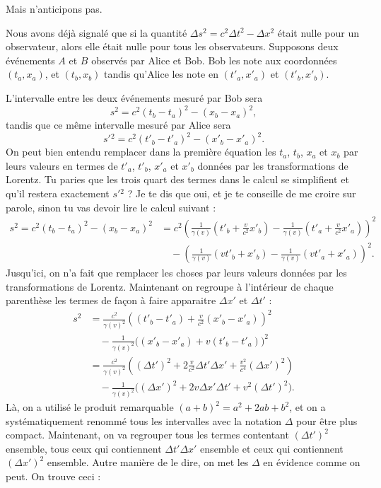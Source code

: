 Mais n'anticipons pas.

Nous avons déjà signalé que si la quantité $\Delta s^2=c^2\Delta t^2-\Delta x^2$ était nulle pour un observateur, alors elle était nulle pour tous les observateurs. Supposons deux événements $A$ et $B$ observés par Alice et Bob. Bob les note aux coordonnées $(t_a,x_a)$, et $(t_b,x_b)$ tandis qu'Alice les note en $(t'_a,x'_a)$ et $(t'_b,x'_b)$.

L'intervalle entre les deux événements mesuré par Bob sera
\[
   s^2=c^2(t_b-t_a)^2-(x_b-x_a)^2,
\]
tandis que ce même intervalle mesuré par Alice sera
\[
  s'{}^2=c^2(t'_b-t'_a)^2-(x'_b-x'_a)^2.
\]
On peut bien entendu remplacer dans la première équation les $t_a$, $t_b$, $x_a$ et $x_b$ par leurs valeurs en termes de $t'_a$, $t'_b$, $x'_a$ et $x'_b$ données par les transformations de Lorentz. Tu paries que les trois quart des termes dans le calcul se simplifient et qu'il restera exactement $s'{}^2$ ? Je te dis que oui, et je te conseille de me croire sur parole, sinon tu vas devoir lire le calcul suivant :
\begin{align*}
s^2=c^2(t_b-t_a)^2-(x_b-x_a)^2&=c^2\left(   \frac{1}{ \gamma(v) }(t'_b+\frac{ v }{ c^2 }x'_b)-\frac{1}{ \gamma(v) }(t'_a+\frac{ v }{ c^2 }x'_a)   \right)^2\\
			&\quad-\left(  \frac{1}{ \gamma(v) }(vt'_b+x'_b)-\frac{1}{ \gamma(v) }(vt'_a+x'_a)  \right)^2.
\end{align*}
Jusqu'ici, on n'a fait que remplacer les choses par leurs valeurs données par les transformations de Lorentz. Maintenant on regroupe à l'intérieur de chaque parenthèse les termes de façon à faire apparaitre $\Delta x'$ et $\Delta t'$ :
\begin{align*}
s^2	&=\frac{ c^2 }{ \gamma(v)^2 }\left( (t'_b-t'_a)+\frac{ v }{ c^2 }(x'_b-x'_a) \right)^2\\
	&\quad-\frac{1}{ \gamma(v)^2 }\big( (x'_b-x'_a)+v(t'_b-t'_a) \big)^2\\
	&=\frac{ c^2 }{ \gamma(v)^2 }\left( (\Delta t')^2+2\frac{ v }{ c^2 }\Delta t'\Delta x'+\frac{ v^2 }{ c^4 }(\Delta x')^2 \right)\\
	&\quad-\frac{1}{ \gamma(v)^2 }\Big( (\Delta x')^2+2v\Delta x'\Delta t'+v^2(\Delta t')^2 \Big).
\end{align*}
Là, on a utilisé le produit remarquable $(a+b)^2=a^2+2ab+b^2$, et on a systématiquement renommé tous les intervalles avec la notation $\Delta$ pour être plus compact. Maintenant, on va regrouper tous les termes contentant $(\Delta t')^2$ ensemble, tous ceux qui contiennent $\Delta t'\Delta x'$ ensemble et ceux qui contiennent $(\Delta x')^2$ ensemble. Autre manière de le dire, on met les $\Delta$ en évidence comme on peut. On trouve ceci :
